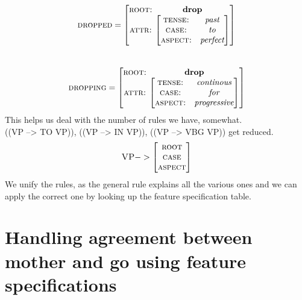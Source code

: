 \documentclass[12pt,a4paper]{article}
\begin{document}
\[
\textsc{dropped}=
\begin{bmatrix}
\textsc{root:} & \mspace{-12mu} \begin{matrix} \textbf{drop} \end{matrix} \\
\begin{matrix} \textsc{attr:} \end{matrix} &
\mspace{-12mu}
\begin{bmatrix}
  \textsc{tense:} & \textit{past}\\
  \textsc{case:} & \textit{to}\\
  \textsc{aspect:} & \textit{perfect}\\
\end{bmatrix}
\end{bmatrix}
\]\\
\[
\textsc{dropping}=
\begin{bmatrix}
\textsc{root:} & \mspace{-12mu} \begin{matrix} \textbf{drop} \end{matrix} \\
\begin{matrix} \textsc{attr:} \end{matrix} &
\mspace{-12mu}
\begin{bmatrix}
  \textsc{tense:} & \textit{continous}\\
  \textsc{case:} & \textit{for}\\
  \textsc{aspect:} & \textit{progressive}\\
\end{bmatrix}
\end{bmatrix}
\]
$ $\\
$ $\\
$ $\\
		This helps us deal with the number of rules we have, somewhat.\\
		((VP --> TO VP)), ((VP --> IN VP)), ((VP --> VBG VP)) get reduced.\\
		\[
\textsc{VP} ->
\begin{bmatrix} 
\textsc{root} \\
\textsc{case} \\
\textsc{aspect} \\
\end{bmatrix}
\]
		We unify the rules, as the general rule explains all the various ones and we can apply the correct one by looking up the feature specification table.\\

	
	\section{Handling agreement between mother and go using feature specifications}
	
\end{document}
